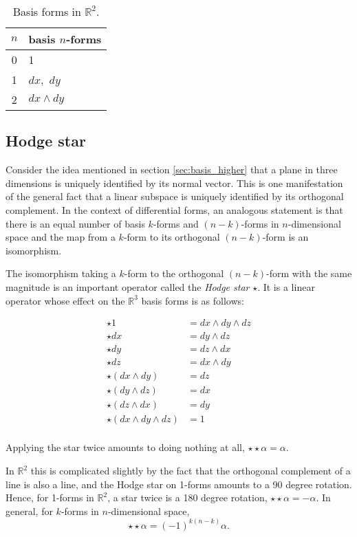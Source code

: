 \documentclass[utf8,english]{gradu3}
\begin{document}
\begin{table}[h]
  \begin{tabular}{c | l}
    $n$ & basis $n$-forms \\
    \hline
    0 & 1 \\
    1 & $dx$,\, $dy$ \\
    2 & $dx \wedge dy$ \\
  \end{tabular}
  \caption{Basis forms in $\mathbb{R}^2$.}
  \label{tab:basis_2d}
\end{table}

\subsection{Hodge star}\label{sec:hodge}

Consider the idea mentioned in section \ref{sec:basis_higher}
that a plane in three dimensions is uniquely identified by its normal vector.
This is one manifestation of the general fact that a linear subspace
is uniquely identified by its orthogonal complement.
In the context of differential forms,
an analogous statement is that there is an equal number
of basis $k$-forms and $(n-k)$-forms in $n$-dimensional space
and the map from a $k$-form to its orthogonal $(n-k)$-form
is an isomorphism.

The isomorphism taking a $k$-form to the orthogonal $(n-k)$-form
with the same magnitude is an important operator
called the \textit{Hodge star} $\star$.
It is a linear operator whose effect on the $\mathbb{R}^3$ basis forms
is as follows:

\begin{align*}
  \star 1 &= dx \wedge dy \wedge dz \\
  \star dx &= dy \wedge dz \\
  \star dy &= dz \wedge dx \\
  \star dz &= dx \wedge dy \\
  \star (dx \wedge dy) &= dz \\
  \star (dy \wedge dz) &= dx \\
  \star (dz \wedge dx) &= dy \\
  \star (dx \wedge dy \wedge dz) &= 1 \\
\end{align*}

Applying the star twice amounts to doing nothing at all,
$\star\star\alpha = \alpha$.

In $\mathbb{R}^2$ this is complicated slightly by the fact that
the orthogonal complement of a line is also a line,
and the Hodge star on 1-forms amounts to a 90 degree rotation.
Hence, for 1-forms in $\mathbb{R}^2$, a star twice is a 180 degree rotation,
$\star\star\alpha = -\alpha$.
In general, for $k$-forms in $n$-dimensional space,
\[
  \star\star\alpha = (-1)^{k(n-k)}\alpha.
\]
\end{document}
